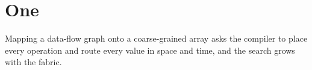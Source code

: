 \section{One}
Mapping a data-flow graph onto a coarse-grained array asks the compiler to place every operation and route every value in space and time, and the search grows with the fabric.
